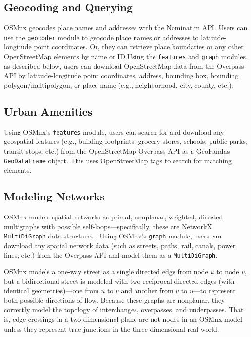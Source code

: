 \documentclass[12pt,letterpaper]{article} %
\begin{document}
\subsection{Geocoding and Querying}

OSMnx geocodes place names and addresses with the Nominatim API\@. Users can use the \texttt{geocoder} module to geocode place names or addresses to latitude-longitude point coordinates. Or, they can retrieve place boundaries or any other OpenStreetMap elements by name or ID.\@ Using the \texttt{features} and \texttt{graph} modules, as described below, users can download OpenStreetMap data from the Overpass API by latitude-longitude point coordinates, address, bounding box, bounding polygon/multipolygon, or place name (e.g., neighborhood, city, county, etc.).

\subsection{Urban Amenities}

Using OSMnx's \texttt{features} module, users can search for and download any geospatial features (e.g., building footprints, grocery stores, schools, public parks, transit stops, etc.) from the OpenStreetMap Overpass API as a GeoPandas \texttt{GeoDataFrame} object. This uses OpenStreetMap tags to search for matching elements.

\subsection{Modeling Networks}

OSMnx models spatial networks as primal, nonplanar, weighted, directed multigraphs with possible self-loops---specifically, these are NetworkX \texttt{MultiDiGraph} data structures \citep{hagberg_exploring_2008}. Using OSMnx's \texttt{graph} module, users can download any spatial network data (such as streets, paths, rail, canals, power lines, etc.) from the Overpass API and model them as a \texttt{MultiDiGraph}.

OSMnx models a one-way street as a single directed edge from node $u$ to node $v$, but a bidirectional street is modeled with two reciprocal directed edges (with identical geometries)---one from $u$ to $v$ and another from $v$ to $u$---to represent both possible directions of flow. Because these graphs are nonplanar, they correctly model the topology of interchanges, overpasses, and underpasses. That is, edge crossings in a two-dimensional plane are not nodes in an OSMnx model unless they represent true junctions in the three-dimensional real world.
\end{document}
